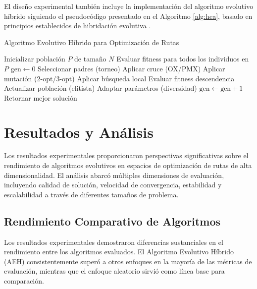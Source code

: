 \documentclass[conference]{IEEEtran}
\begin{document}
El diseño experimental también incluye la implementación del algoritmo evolutivo híbrido siguiendo el pseudocódigo presentado en el Algoritmo \ref{alg:hea}, basado en principios establecidos de hibridación evolutiva \cite{alba2013}.


\begin{algorithm}[H]
\small %
\caption{Algoritmo Evolutivo Híbrido para Optimización de Rutas}
\label{alg:hea}
\begin{algorithmic}[1]
\STATE Inicializar población $P$ de tamaño $N$
\STATE Evaluar fitness para todos los individuos en $P$
\STATE $\text{gen} \leftarrow 0$
    \STATE Seleccionar padres (torneo)
    \STATE Aplicar cruce (OX/PMX)
    \STATE Aplicar mutación (2-opt/3-opt)
    \STATE Aplicar búsqueda local
    \STATE Evaluar fitness descendencia
    \STATE Actualizar población (elitista)
    \STATE Adaptar parámetros (diversidad)
    \STATE $\text{gen} \leftarrow \text{gen} + 1$
\ENDWHILE
\STATE Retornar mejor solución
\end{algorithmic}
\end{algorithm}


\section{Resultados y Análisis}

Los resultados experimentales proporcionaron perspectivas significativas sobre el rendimiento de algoritmos evolutivos en espacios de optimización de rutas de alta dimensionalidad. El análisis abarcó múltiples dimensiones de evaluación, incluyendo calidad de solución, velocidad de convergencia, estabilidad y escalabilidad a través de diferentes tamaños de problema.

\subsection{Rendimiento Comparativo de Algoritmos}

Los resultados experimentales demostraron diferencias sustanciales en el rendimiento entre los algoritmos evaluados. El Algoritmo Evolutivo Híbrido (AEH) consistentemente superó a otros enfoques en la mayoría de las métricas de evaluación, mientras que el enfoque aleatorio sirvió como línea base para comparación.

\end{document}
